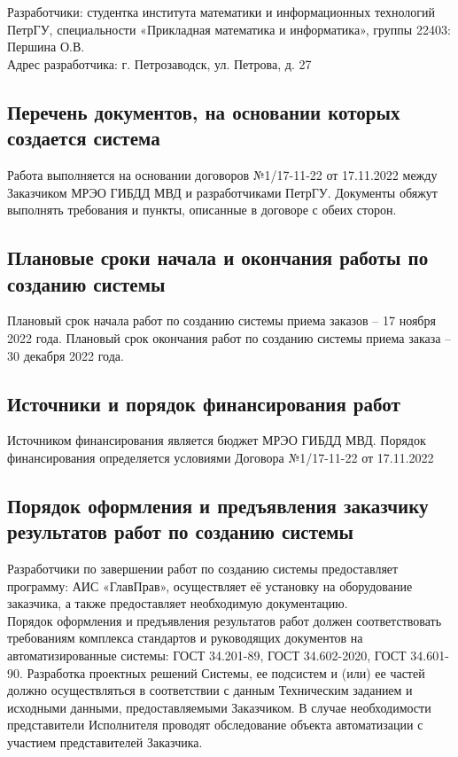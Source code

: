 \documentclass[russian, utf8, 12pt,pointsubsection,floatsubsection]{eskdtext}
\begin{document}
Разработчики: студентка института математики и информационных технологий ПетрГУ, специальности «Прикладная математика и информатика», группы 22403: Першина О.В.  \\

 Адрес разработчика: г. Петрозаводск, ул. Петрова, д. 27

\subsection{Перечень документов, на основании которых создается система}
Работа выполняется на основании договоров №1/17-11-22 от 17.11.2022 между Заказчиком МРЭО ГИБДД МВД  и разработчиками ПетрГУ. Документы обяжут выполнять требования и пункты, описанные в договоре с обеих сторон.

\subsection{Плановые сроки начала и окончания работы по созданию системы}
Плановый срок начала работ по созданию системы приема заказов – 17 ноября 2022 года.
Плановый срок окончания работ по созданию системы приема заказа – 30 декабря 2022 года.

\subsection{Источники и порядок финансирования работ}
Источником	финансирования	является	бюджет	МРЭО ГИБДД МВД.
Порядок	финансирования	определяется	условиями	Договора
№1/17-11-22 от 17.11.2022

\subsection{Порядок оформления и предъявления заказчику результатов работ по созданию системы}
Разработчики по завершении работ по созданию системы предоставляет программу: АИС «ГлавПрав», осуществляет её установку на оборудование заказчика, а также предоставляет необходимую документацию. \\

Порядок	оформления	и предъявления результатов работ должен соответствовать требованиям комплекса стандартов и руководящих документов на автоматизированные системы: ГОСТ 34.201-89, ГОСТ 34.602-2020, ГОСТ 34.601-90.
Разработка проектных решений Системы, ее подсистем и (или) ее частей должно осуществляться в соответствии с данным Техническим заданием и исходными данными, предоставляемыми Заказчиком. В случае необходимости представители Исполнителя проводят обследование объекта автоматизации с участием представителей Заказчика.
\end{document}
